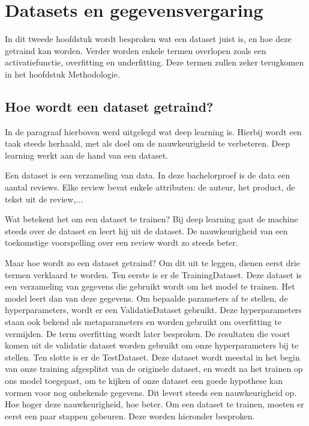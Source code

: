 \section{Datasets en gegevensvergaring}
\label{sec:datasetsgegevensvergaring}
In dit tweede hoofdstuk wordt besproken wat een dataset juist is, en hoe deze getraind kan worden. Verder worden enkele termen overlopen zoals een activatiefunctie, overfitting en underfitting. Deze termen zullen zeker terugkomen in het hoofdstuk Methodologie. 

\subsection{Hoe wordt een dataset getraind?}
\label{sec:hoewordtdatasetgetraind}
In de paragraaf hierboven werd uitgelegd wat deep learning is. Hierbij wordt een taak steeds herhaald, met als doel om de nauwkeurigheid te verbeteren. Deep learning werkt aan de hand van een dataset. 

Een dataset is een verzameling van data. In deze bachelorproef is de data een aantal reviews. Elke review bevat enkele attributen: de auteur, het product, de tekst uit de review,...

Wat betekent het om een dataset te trainen? Bij deep learning gaat de machine steeds over de dataset en leert hij uit de dataset. De nauwkeurigheid van een toekomstige voorspelling over een review wordt zo steeds beter. 

Maar hoe wordt zo een dataset getraind?
Om dit uit te leggen, dienen eerst drie termen verklaard te worden. Ten eerste is er de \gls{TrainingDataset}. Deze dataset is een verzameling van gegevens die gebruikt wordt om het model te trainen. Het model leert dan van deze gegevens. Om bepaalde parameters af te stellen, de hyperparameters, wordt er een \gls{ValidatieDataset} gebruikt. Deze hyperparameters staan ook bekend als metaparameters en worden gebruikt om overfitting te vermijden. De term overfitting wordt later besproken. De resultaten die voort komen uit de validatie dataset worden gebruikt om onze hyperparameters bij te stellen. Ten slotte is er de \gls{TestDataset}. Deze dataset wordt meestal in het begin van onze training afgesplitst van de originele dataset, en wordt na het trainen op ons model toegepast, om te kijken of onze dataset een goede hypothese kan vormen voor nog onbekende gegevens. Dit levert steeds een nauwkeurigheid op. Hoe hoger deze nauwkeurigheid, hoe beter. \autocite{Shah2017} Om een dataset te trainen, moeten er eerst een paar stappen gebeuren. Deze worden hieronder besproken. 

